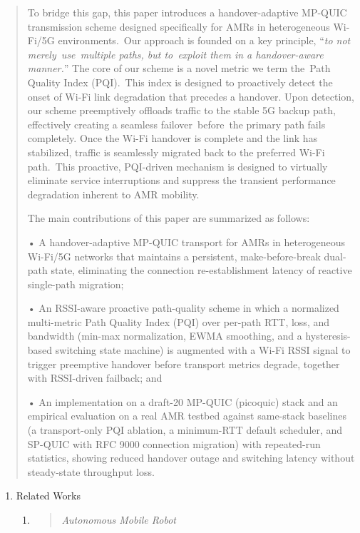 \begin{quote}
To bridge this gap, this paper introduces a handover-adaptive MP-QUIC transmission scheme designed specifically for AMRs in heterogeneous Wi-Fi/5G environments.~Our approach is founded on a key principle, ``\emph{to not merely~use~multiple paths, but to~exploit them in a handover-aware manner.}'' The core of our scheme is a novel metric we term the~Path Quality Index (PQI).~This index is designed to proactively detect the onset of Wi-Fi link degradation that precedes a handover. Upon detection, our scheme preemptively offloads traffic to the stable 5G backup path, effectively creating a seamless failover~before~the primary path fails completely. Once the Wi-Fi handover is complete and the link has stabilized, traffic is seamlessly migrated back to the preferred Wi-Fi path.~This proactive, PQI-driven mechanism is designed to virtually eliminate service interruptions and suppress the transient performance degradation inherent to AMR mobility.

The main contributions of this paper are summarized as follows:

• A handover-adaptive MP-QUIC transport for AMRs in heterogeneous Wi-Fi/5G networks that maintains a persistent, make-before-break dual-path state, eliminating the connection re-establishment latency of reactive single-path migration;

• An RSSI-aware proactive path-quality scheme in which a normalized multi-metric Path Quality Index (PQI) over per-path RTT, loss, and bandwidth (min-max normalization, EWMA smoothing, and a hysteresis-based switching state machine) is augmented with a Wi-Fi RSSI signal to trigger preemptive handover before transport metrics degrade, together with RSSI-driven failback; and

• An implementation on a draft-20 MP-QUIC (picoquic) stack and an empirical evaluation on a real AMR testbed against same-stack baselines (a transport-only PQI ablation, a minimum-RTT default scheduler, and SP-QUIC with RFC 9000 connection migration) with repeated-run statistics, showing reduced handover outage and switching latency without steady-state throughput loss.
\end{quote}

\begin{enumerate}
\def\labelenumi{\arabic{enumi}.}
\setcounter{enumi}{1}
\item
  Related Works

  \begin{enumerate}
  \def\labelenumii{\arabic{enumii}.}
  \item
    \begin{quote}
    \emph{Autonomous Mobile Robot}
    \end{quote}
  \end{enumerate}
\end{enumerate}

